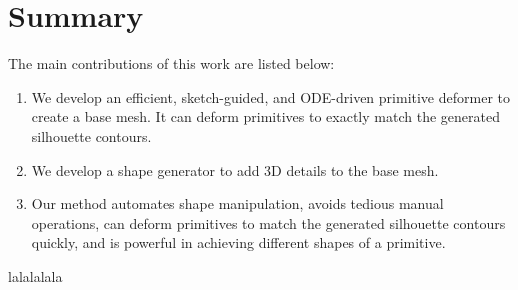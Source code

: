 \documentclass[12pt]{article}
\begin{document}
\section{Summary}
The main contributions of this work are listed below:
\begin{enumerate}
	\item We develop an efficient, sketch-guided, and ODE-driven primitive deformer to create a base mesh. It can deform primitives to exactly match the generated silhouette contours.
	\item We develop a shape generator to add 3D details to the base mesh.
	\item Our method automates shape manipulation, avoids tedious manual operations, can deform primitives to match the generated silhouette contours quickly, and is powerful in achieving different shapes of a primitive.
\end{enumerate}


 

lalalalala
\end{document}
